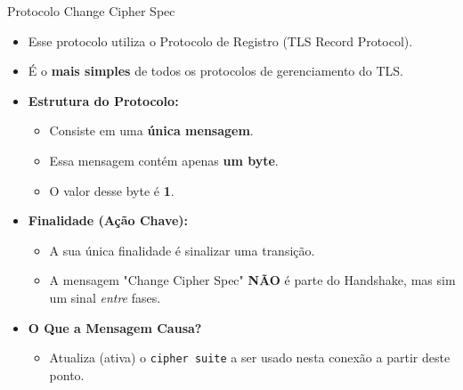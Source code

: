 \begin{frame}{Protocolo Change Cipher Spec}
    \begin{itemize}
        \item Esse protocolo utiliza o Protocolo de Registro (TLS Record Protocol).
        \item É o \textbf{mais simples} de todos os protocolos de gerenciamento do TLS.

        \item \textbf{Estrutura do Protocolo:}
              \begin{itemize}
                  \item Consiste em uma \textbf{única mensagem}.
                  \item Essa mensagem contém apenas \textbf{um byte}.
                  \item O valor desse byte é \textbf{1}.
              \end{itemize}

        \item \textbf{Finalidade (Ação Chave):}
              \begin{itemize}
                  \item A sua única finalidade é sinalizar uma transição.
                  \item A mensagem "Change Cipher Spec" \textbf{NÃO} é parte do Handshake, mas sim um sinal \textit{entre} fases.
              \end{itemize}

        \item \textbf{O Que a Mensagem Causa?}
              \begin{itemize}
                  \item  Atualiza (ativa) o \texttt{cipher suite} a ser usado nesta conexão a partir deste ponto.
              \end{itemize}
    \end{itemize}
\end{frame}

